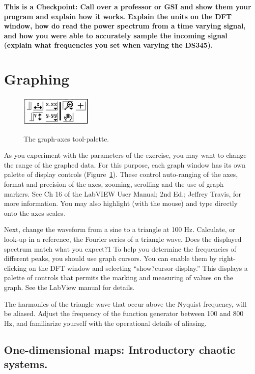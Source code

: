 \documentclass{../lab}
\begin{document}
\textbf{This is a Checkpoint: Call over a professor or GSI and show them your program and explain how it works.  Explain the units on the DFT window, how do read the power spectrum from a time varying signal, and how you were able to accurately sample the incoming signal (explain what frequencies you set when varying the DS345).}

\section{Graphing}

\begin{figure}[h]
    \centering
    \href{http://experimentationlab.berkeley.edu/sites/default/files/images/Nldimage069.gif}{\includegraphics[width=0.3\linewidth]{images/Nldimage069.png}}
    \caption{The graph-axes tool-palette.}
    \label{fig:GraphAxesToolPalette}
\end{figure}

As you experiment with the parameters of the exercise, you may want to change the range of the graphed data. For this purpose, each graph window has its own palette of display controls (Figure~\ref{fig:GraphAxesToolPalette}). These control auto-ranging of the axes, format and precision of the axes, zooming, scrolling and the use of graph markers. See Ch 16 of the LabVIEW User Manual; 2nd Ed.; Jeffrey Travis, for more information. You may also highlight (with the mouse) and type directly onto the axes scales.

Next, change the waveform from a sine to a triangle at 100 Hz. Calculate, or look-up in a reference, the Fourier series of a triangle wave. Does the displayed spectrum match what you expect?1 To help you determine the frequencies of different peaks, you should use graph cursors. You can enable them by right-clicking on the DFT window and selecting ``show?cursor display.'' This displays a palette of controls that permits the marking and measuring of values on the graph. See the LabView manual for details.

The harmonics of the triangle wave that occur above the Nyquist frequency, will be aliased. Adjust the frequency of the function generator between 100 and 800 Hz, and familiarize yourself with the operational details of aliasing.

\subsection{One-dimensional maps: Introductory chaotic systems.}
\end{document}
